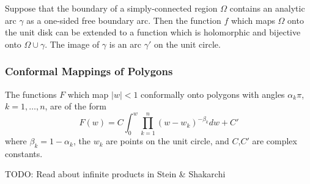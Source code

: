 \begin{theorem}
  Suppose that the boundary of a simply-connected region $\Omega$ contains an analytic arc $\gamma$ as a one-sided free boundary arc. Then the function $f$ which maps $\Omega$ onto the unit disk can be extended to a function which is holomorphic and bijective onto $\Omega \cup \gamma$. The image of $\gamma$ is an arc $\gamma'$ on the unit circle.
\end{theorem}

\subsubsection{Conformal Mappings of Polygons}

\begin{theorem}
  The functions $F$ which map $|w| < 1$ conformally onto polygons with angles $\alpha_k \pi$, $k = 1, \dots, n$, are of the form
  \[
  F(w) = C \int_0^w \prod_{k=1}^n (w-w_k)^{-\beta_k} d w + C'
  \]
  where $\beta_k = 1-\alpha_k$, the $w_k$ are points on the unit circle, and $C$,$C'$ are complex constants.
\end{theorem}

TODO: Read about infinite products in Stein \& Shakarchi

